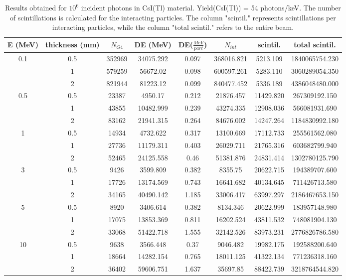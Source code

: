 \documentclass{article}
\begin{document}
\begin{table}[H]
    \centering
    \begin{tabular}{|cccccccc|}
    \hline
       E (MeV) & thickness (mm) & $N_{G4}$ &  DE (MeV) &  DE($\frac{MeV}{part}$)  &  $N_{int}$  &  scintil.  &  total scintil. \\ \hline
        \multirow{3}{*}{0.1} & 0.5 & 352969 & 34075.292 & 0.097 & 368016.821 & 5213.109 & 1840065754.230 \\ 
         & 1 & 579259 & 56672.02 & 0.098 & 600597.261 & 5283.110 & 3060289054.350 \\ 
         & 2 & 821944 & 81223.12 & 0.099 & 840477.452 & 5336.189 & 4386048480.000 \\ \hline
        \multirow{3}{*}{0.5} & 0.5 & 23387 & 4950.17 & 0.212 & 21876.457 & 11429.820 & 267309192.150 \\ 
         & 1 & 43855 & 10482.999 & 0.239 & 43274.335 & 12908.036 & 566081931.690 \\ 
         & 2 & 83162 & 21941.315 & 0.264 & 84676.002 & 14247.264 & 1184830992.180 \\ \hline
        \multirow{3}{*}{1} & 0.5 & 14934 & 4732.622 & 0.317 & 13100.669 & 17112.733 & 255561562.080 \\ 
         & 1 & 27736 & 11179.311 & 0.403 & 26029.711 & 21765.316 & 603682799.940 \\ 
         & 2 & 52465 & 24125.558 & 0.46 & 51381.876 & 24831.414 & 1302780125.790 \\ \hline
        \multirow{3}{*}{3} & 0.5 & 9426 & 3599.809 & 0.382 & 8355.75 & 20622.715 & 194389707.600 \\ 
         & 1 & 17726 & 13174.569 & 0.743 & 16641.682 & 40134.645 & 711426713.580 \\ 
         & 2 & 34165 & 40490.142 & 1.185 & 33006.417 & 63997.297 & 2186467653.150 \\ \hline
        \multirow{3}{*}{5}& 0.5 & 8920 & 3406.614 & 0.382 & 8134.346 & 20622.999 & 183957148.980 \\ 
         & 1 & 17075 & 13853.369 & 0.811 & 16202.524 & 43811.532 & 748081904.130 \\ 
         & 2 & 33068 & 51422.718 & 1.555 & 32142.526 & 83973.231 & 2776826786.580 \\ \hline
        \multirow{3}{*}{10} & 0.5 & 9638 & 3566.448 & 0.37 & 9046.482 & 19982.175 & 192588200.640 \\ 
         & 1 & 18664 & 14282.154 & 0.765 & 18011.125 & 41322.134 & 771236318.160 \\ 
         & 2 & 36402 & 59606.751 & 1.637 & 35697.85 & 88422.739 & 3218764544.820 \\ \hline
    \end{tabular}
    \caption{Results obtained for $10^6$ incident photons in CsI(Tl) material. Yield(CsI(Tl)) = 54 photons/keV. The number of scintillations is calculated for the interacting particles. The column "scintil." represents scintillations per interacting particles, while the column "total scintil." refers to the entire beam. }
\end{table}
\end{document}
